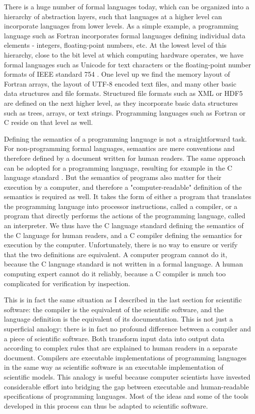 There is a huge number of formal languages today, which can be organized into a hierarchy of abstraction layers, such that languages at a higher level can incorporate languages from lower levels. As a simple example, a programming language such as Fortran incorporates formal languages defining individual data elements - integers, floating-point numbers, etc. At the lowest level of this hierarchy, close to the bit level at which computing hardware operates, we have formal languages such as Unicode \cite{_unicode_2015} for text characters or the floating-point number formats of IEEE standard 754 \cite{_ieee_2008}. One level up we find the memory layout of Fortran arrays, the layout of UTF-8 encoded text files, and many other basic data structures and file formats. Structured file formats such as XML \cite{_extensible_1998} or HDF5 \cite{hdf5} are defined on the next higher level, as they incorporate basic data structures such as trees, arrays, or text strings. Programming languages such as Fortran or C reside on that level as well.

Defining the semantics of a programming language is not a straightforward task. For non-programming formal languages, semantics are mere conventions and therefore defined by a document written for human readers. The same approach can be adopted for a programming language, resulting for example in the C language standard \cite{_iso/iec_2011}. But the semantics of programs also matter for their execution by a computer, and therefore a "computer-readable" definition of the semantics is required as well. It takes the form of either a program that translates the programming language into processor instructions, called a compiler, or a program that directly performs the actions of the programming language, called an interpreter. We thus have the C language standard defining the semantics of the C language for human readers, and a C compiler defining the semantics for execution by the computer. Unfortunately, there is no way to ensure or verify that the two definitions are equivalent. A computer program cannot do it, because the C language standard is not written in a formal language. A human computing expert cannot do it reliably, because a C compiler is much too complicated for verification by inspection.

This is in fact the same situation as I described in the last section for scientific software: the compiler is the equivalent of the scientific software, and the language definition is the equivalent of its documentation. This is not just a superficial analogy: there is in fact no profound difference between a compiler and a piece of scientific software. Both transform input data into output data according to complex rules that are explained to human readers in a separate document. Compilers are executable implementations of programming languages in the same way as scientific software is an executable implementation of scientific models. This analogy is useful because computer scientists have invested considerable effort into bridging the gap between executable and human-readable specifications of programming languages. Most of the ideas and some of the tools developed in this process can thus be adapted to scientific software.

